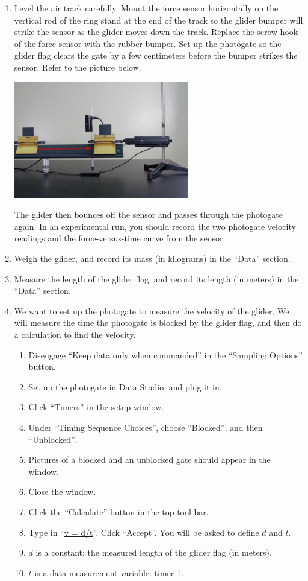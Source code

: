 \begin{enumerate}[label=\arabic*.]

\item Level the air track carefully.  Mount the force sensor horizontally on the vertical rod of the ring stand at the end of the track so the glider bumper will strike the sensor as the glider moves down the track.  Replace the screw hook of the force sensor with the rubber bumper.  Set up the photogate so the glider flag clears the gate by a few centimeters before the bumper strikes the sensor.  Refer to the picture below.
\begin{center} \includegraphics*[width=0.6\textwidth]{imgs/6labs/6Alab/6Aexp5/gif_still.jpg} \end{center}
The glider then bounces off the sensor and passes through the photogate again.  In an experimental run, you should record the two photogate velocity readings and the force-versus-time curve from the sensor.

\item Weigh the glider, and record its mass (in kilograms) in the ``Data'' section.

\item Measure the length of the glider flag, and record its length (in meters) in the ``Data'' section.

\item We want to set up the photogate to measure the velocity of the glider.  We will measure the time the photogate is blocked by the glider flag, and then do a calculation to find the velocity.
\begin{enumerate}[label=\alph*.]
\item Disengage ``Keep data only when commanded'' in the ``Sampling Options'' button.
\item Set up the photogate in Data Studio, and plug it in.
\item Click ``Timers'' in the setup window.
\item Under ``Timing Sequence Choices'', choose ``Blocked'', and then ``Unblocked''.
\item Pictures of a blocked and an unblocked gate should appear in the window.
\item Close the window.
\item Click the ``Calculate'' button in the top tool bar.
\item Type in ``\url{v = d/t}''.  Click ``Accept''.  You will be asked to define \(d\) and \(t\).
\squishlist
  \item \(d\) is a constant: the measured length of the glider flag (in meters).
  \item \(t\) is a data measurement variable: timer 1.
\squishend


\end{enumerate}
\end{enumerate}
